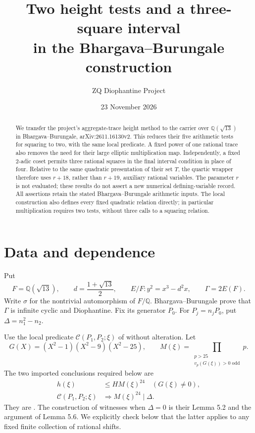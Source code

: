 \documentclass[11pt,a4paper]{article}
\title{Two height tests and a three-square interval\protect\\
in the Bhargava--Burungale construction}
\author{ZQ Diophantine Project}
\date{23 November 2026}
\newcommand{\Q}{\mathbb Q}\newcommand{\Z}{\mathbb Z}
\begin{document}
\maketitle
\begin{abstract}
We transfer the project's aggregate-trace height method to the carrier
over $\Q(\sqrt{13})$ in Bhargava--Burungale, arXiv:2611.16130v2.
This reduces their five arithmetic tests for squaring to two, with the
same local predicate. A fixed power of one rational trace also removes
the need for their large elliptic multiplication map. Independently,
a fixed $2$-adic coset permits
three rational squares in the final interval condition in place of
four. Relative to the same quadratic presentation of their set $T$,
the quartic wrapper therefore uses $r+18$, rather than $r+19$,
auxiliary rational variables. The parameter $r$ is not evaluated;
these results do not assert a new numerical defining-variable record.
All assertions retain the stated Bhargava--Burungale arithmetic inputs.
The local construction also defines every fixed quadratic relation
directly; in particular multiplication requires two tests, without
three calls to a squaring relation.
\end{abstract}

\section{Data and dependence}
Put
\[
 F=\Q(\sqrt{13}),\qquad d=\frac{1+\sqrt{13}}2,\qquad
 E/F:y^2=x^3-d^2x,\qquad \Gamma=2E(F).
\]
Write $\sigma$ for the nontrivial automorphism of $F/\Q$.
Bhargava--Burungale \cite[Lemmas 4.1--4.2]{BB} prove that
$\Gamma$ is infinite cyclic and Diophantine. Fix its generator $P_0$.
For $P_j=n_jP_0$, put $\Delta=n_1^2-n_2$.

Use the local predicate $\mathcal C(P_1,P_2;\xi)$ of
\cite[Definition 5.3]{BB} without alteration. Let
\[
 G(X)=(X^2-1)(X^2-9)(X^2-25),\qquad
 M(\xi)=\prod_{\substack{p>25\\v_p(G(\xi))>0\text{ odd}}}p.
\]
The two imported conclusions required below are
\begin{align}
 h(\xi)&\le H M(\xi)^{24}\quad(G(\xi)\ne0),\label{eq:height}\tag{H}\\
 \mathcal C(P_1,P_2;\xi)&\Longrightarrow M(\xi)^{24}\mid\Delta.
 \label{eq:div}\tag{D}
\end{align}
They are \cite[Proposition 3.1 and Lemma 5.4]{BB}. The construction
of witnesses when $\Delta=0$ is their Lemma 5.2 and the argument of
Lemma 5.6. We explicitly check below that the latter applies to any
fixed finite collection of rational shifts.
\end{document}

